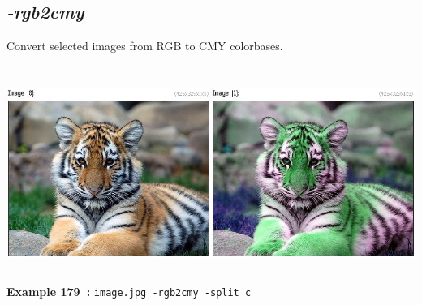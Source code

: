 \documentclass[a4paper,11pt,twoside]{book}
\begin{document}
\subsection{\emph{-rgb2cmy} }\vspace*{-0.5em}
Convert selected images from RGB to CMY colorbases.
\begin{center}\includegraphics[keepaspectratio=true,height=7cm,width=\textwidth]{img/gmic_def179.jpg}\\
{\footnotesize \textbf{Example 179~:} \texttt{image.jpg -rgb2cmy -split c}}
\end{center}
\end{document}
